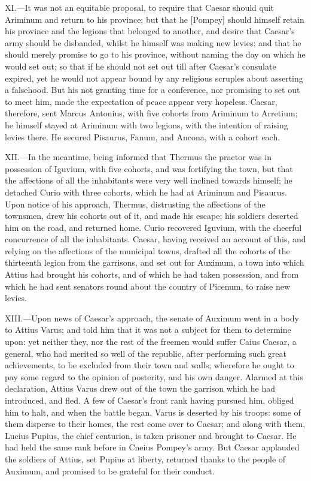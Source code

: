 XI.—It was not an equitable proposal, to require that Caesar should
quit Ariminum and return to his province; but that he [Pompey] should
himself retain his province and the legions that belonged to another,
and desire that Caesar's army should be disbanded, whilst he himself was
making new levies: and that he should merely promise to go to his
province, without naming the day on which he would set out; so that if
he should not set out till after Caesar's consulate expired, yet he
would not appear bound by any religious scruples about asserting a
falsehood. But his not granting time for a conference, nor promising to
set out to meet him, made the expectation of peace appear very hopeless.
Caesar, therefore, sent Marcus Antonius, with five cohorts from Ariminum
to Arretium; he himself stayed at Ariminum with two legions, with the
intention of raising levies there. He secured Pisaurus, Fanum, and
Ancona, with a cohort each.

XII.—In the meantime, being informed that Thermus the praetor was in
possession of Iguvium, with five cohorts, and was fortifying the town,
but that the affections of all the inhabitants were very well inclined
towards himself; he detached Curio with three cohorts, which he had at
Ariminum and Pisaurus. Upon notice of his approach, Thermus, distrusting
the affections of the townsmen, drew his cohorts out of it, and made his
escape; his soldiers deserted him on the road, and returned home. Curio
recovered Iguvium, with the cheerful concurrence of all the inhabitants.
Caesar, having received an account of this, and relying on the
affections of the municipal towns, drafted all the cohorts of the
thirteenth legion from the garrisons, and set out for Auximum, a town
into which Attius had brought his cohorts, and of which he had taken
possession, and from which he had sent senators round about the country
of Picenum, to raise new levies.

XIII.—Upon news of Caesar's approach, the senate of Auximum went in a
body to Attius Varus; and told him that it was not a subject for them to
determine upon: yet neither they, nor the rest of the freemen would
suffer Caius Caesar, a general, who had merited so well of the republic,
after performing such great achievements, to be excluded from their town
and walls; wherefore he ought to pay some regard to the opinion of
posterity, and his own danger. Alarmed at this declaration, Attius Varus
drew out of the town the garrison which he had introduced, and fled. A
few of Caesar's front rank having pursued him, obliged him to halt, and
when the battle began, Varus is deserted by his troops: some of them
disperse to their homes, the rest come over to Caesar; and along with
them, Lucius Pupius, the chief centurion, is taken prisoner and brought
to Caesar. He had held the same rank before in Cneius Pompey's army. But
Caesar applauded the soldiers of Attius, set Pupius at liberty, returned
thanks to the people of Auximum, and promised to be grateful for their
conduct.

